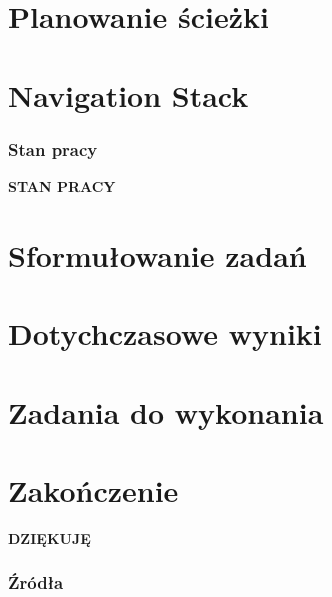 \documentclass[aspectratio=169,11pt]{beamer}
\let\oldheadcommand\headcommand
\newcommand{\resumenavigation}{\addtocontents{nav}{\string\let\string\headcommand\string\oldheadcommand}}
\begin{document}
\section{Planowanie ścieżki}


\section{Navigation Stack}


{
\begin{frame}
\frametitle{Stan pracy}
	\begin{center}
		\LARGE{\textbf{STAN PRACY}}
	\end{center}
\end{frame}
}

\section{Sformułowanie zadań}


\section{Dotychczasowe wyniki}


\section{Zadania do wykonania}


\section{Zakończenie}
\begin{frame}
	\begin{center}
	\LARGE{\textbf{DZIĘKUJĘ}}
	\end{center}
\end{frame}



\begin{frame}
\frametitle{Źródła}
\printbibliography
\end{frame}

\end{document}
